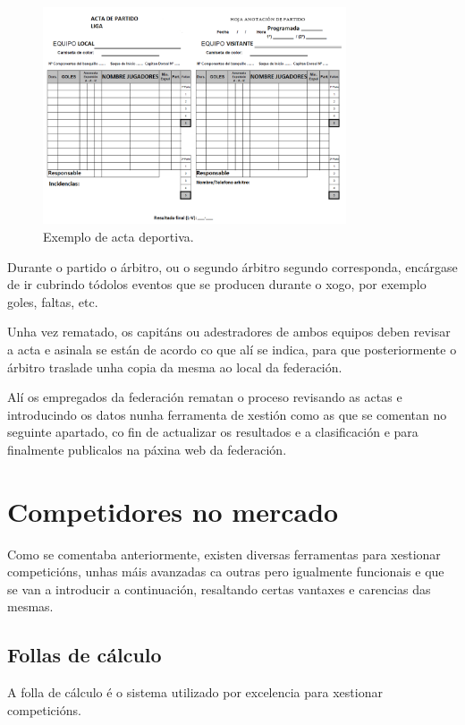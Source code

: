     \begin{figure}[h]
          \begin{center}
            \includegraphics[width=0.8\textwidth]{./img/acta.png}
            \caption{Exemplo de acta deportiva.}
            \label{fig:img:acta}
          \end{center}
    \end{figure}

  Durante o partido o árbitro, ou o segundo árbitro segundo corresponda, 
encárgase de ir cubrindo tódolos eventos que se producen durante o xogo, por 
exemplo goles, faltas, etc.

  Unha vez rematado, os capitáns ou adestradores de ambos equipos deben revisar 
a acta e asinala se están de acordo co que alí se indica, para que 
posteriormente o árbitro traslade unha copia da mesma ao local da federación.

  Alí os empregados da federación rematan o proceso revisando as actas e 
introducindo os datos nunha ferramenta de xestión como as que se comentan no 
seguinte apartado, co fin de actualizar os resultados e a clasificación e para 
finalmente publicalos na páxina web da federación.

  \section{Competidores no mercado}
  Como se comentaba anteriormente, existen diversas ferramentas para xestionar 
competicións, unhas máis avanzadas ca outras pero igualmente funcionais e que 
se van a introducir a continuación, resaltando certas vantaxes e carencias 
das mesmas.

    \subsection{Follas de cálculo}
    A folla de cálculo é o sistema utilizado por excelencia para 
xestionar competicións.

